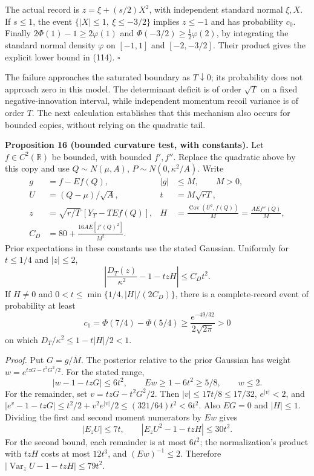 \documentclass[11pt,a4paper]{article}
\begin{document}
The actual record is \(z=\xi+(s/2)X^2\), with independent standard
normal \(\xi,X\). If \(s\le1\), the event \(\{|X|\le1,\ \xi\le-3/2\}\)
implies \(z\le-1\) and has probability \(c_0\). Finally
\(2\Phi(1)-1\ge2\varphi(1)\) and \(\Phi(-3/2)\ge\frac12\varphi(2)\), by
integrating the standard normal density \(\varphi\) on \([-1,1]\) and
\([-2,-3/2]\). Their product gives the explicit lower bound in (114).
\(\square\)

The failure approaches the saturated boundary as \(T\downarrow0\); its
probability does not approach zero in this model. The determinant
deficit is of order \(\sqrt T\) on a fixed negative-innovation interval,
while independent momentum recoil variance is of order \(T\). The next
calculation establishes that this mechanism also occurs for bounded
copies, without relying on the quadratic tail.

\textbf{Proposition 16 (bounded curvature test, with constants).} Let
\(f\in C^2(\mathbb R)\) be bounded, with bounded \(f',f''\). Replace the
quadratic above by this copy and use \(Q\sim N(\mu,A)\),
\(P\sim N(0,\kappa^2/A)\). Write \[\begin{aligned}
g&=f-Ef(Q),& |g|&\le M,\qquad M>0,\\
U&=(Q-\mu)/\sqrt A,& t&=M\sqrt{rT},\\
z&=\sqrt{r/T}\,[Y_T-T Ef(Q)],&
H&=\frac{\operatorname{Cov}(U^2,f(Q))}{M}
   =\frac{A Ef''(Q)}M,\\
C_D&=80+\frac{16A E[f'(Q)^2]}{M^2}.&&
\end{aligned}\tag{115}\] Prior expectations in these constants use the
stated Gaussian. Uniformly for \(t\le1/4\) and \(|z|\le2\),
\[\left|\frac{D_T(z)}{\kappa^2}-1-tzH\right|
 \le C_Dt^2.\tag{116}\] If \(H\ne0\) and
\(0<t\le\min\{1/4,|H|/(2C_D)\}\), there is a complete-record event of
probability at least \[c_1=\Phi(7/4)-\Phi(5/4)
 \ge\frac{e^{-49/32}}{2\sqrt{2\pi}}>0\] on which
\(D_T/\kappa^2\le1-t|H|/2<1\).

\emph{Proof.} Put \(G=g/M\). The posterior relative to the prior
Gaussian has weight \(w=e^{tzG-t^2G^2/2}\). For the stated range,
\[|w-1-tzG|\le6t^2,\qquad Ew\ge1-6t^2\ge5/8,
\qquad w\le2.\] For the remainder, set \(v=tzG-t^2G^2/2\). Then
\(|v|\le17t/8\le17/32\), \(e^{|v|}<2\), and
\(|e^v-1-tzG|\le t^2/2+v^2e^{|v|}/2 \le(321/64)t^2<6t^2\). Also \(EG=0\)
and \(|H|\le1\). Dividing the first and second moment numerators by
\(Ew\) gives \[|E_zU|\le7t,\qquad
|E_zU^2-1-tzH|\le30t^2.\] For the second bound, each remainder is at
most \(6t^2\); the normalization's product with \(tzH\) costs at most
\(12t^3\), and \((Ew)^{-1}\le2\). Therefore
\(|\operatorname{Var}_zU-1-tzH|\le79t^2\).
\end{document}
